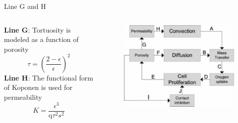 \documentclass[11pt,t]{beamer}
\begin{document}
\begin{frame}[fragile]{Line G and H}  

	\begin{columns}[t]
		\begin{column}{.75\textwidth}
\textbf{Line G}: Tortuosity is modeled as a function of porosity
\[
\tau = \left( \frac { 2 - \epsilon } { \epsilon } \right) ^ { 2 }
\]
\textbf{Line H}: The functional form of Koponen is used for permeability
\[
K = \frac { \epsilon ^ { 3 } } { \mathrm { q } \tau ^ { 2 } s ^ { 2 } }
\]

		\end{column}
		\begin{column}{.25\textwidth}
			
			\begin{figure}
			\centering
			\includegraphics[width=\textwidth]{math_scheme}
			
			\end{figure}
		\end{column}
	\end{columns}	
		
\end{frame}
\end{document}
